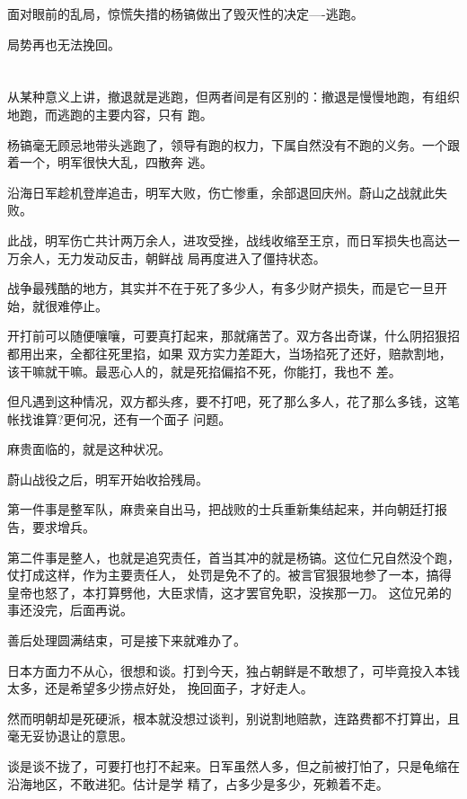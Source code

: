 \documentclass[11pt,a4paper,onecolumn]{article}
\begin{document}
面对眼前的乱局，惊慌失措的杨镐做出了毁灭性的决定----逃跑。

局势再也无法挽回。

\section[\thesection]{}

从某种意义上讲，撤退就是逃跑，但两者间是有区别的：撤退是慢慢地跑，有组织地跑，而逃跑的主要内容，只有
跑。

杨镐毫无顾忌地带头逃跑了，领导有跑的权力，下属自然没有不跑的义务。一个跟着一个，明军很快大乱，四散奔
逃。

沿海日军趁机登岸追击，明军大败，伤亡惨重，余部退回庆州。蔚山之战就此失败。

此战，明军伤亡共计两万余人，进攻受挫，战线收缩至王京，而日军损失也高达一万余人，无力发动反击，朝鲜战
局再度进入了僵持状态。

战争最残酷的地方，其实并不在于死了多少人，有多少财产损失，而是它一旦开始，就很难停止。

开打前可以随便嚷嚷，可要真打起来，那就痛苦了。双方各出奇谋，什么阴招狠招都用出来，全都往死里掐，如果
双方实力差距大，当场掐死了还好，赔款割地，该干嘛就干嘛。最恶心人的，就是死掐偏掐不死，你能打，我也不
差。

但凡遇到这种情况，双方都头疼，要不打吧，死了那么多人，花了那么多钱，这笔帐找谁算?更何况，还有一个面子
问题。

麻贵面临的，就是这种状况。

蔚山战役之后，明军开始收拾残局。

第一件事是整军队，麻贵亲自出马，把战败的士兵重新集结起来，并向朝廷打报告，要求增兵。

第二件事是整人，也就是追究责任，首当其冲的就是杨镐。这位仁兄自然没个跑，仗打成这样，作为主要责任人，
处罚是免不了的。被言官狠狠地参了一本，搞得皇帝也怒了，本打算劈他，大臣求情，这才罢官免职，没挨那一刀。
这位兄弟的事还没完，后面再说。

善后处理圆满结束，可是接下来就难办了。

日本方面力不从心，很想和谈。打到今天，独占朝鲜是不敢想了，可毕竟投入本钱太多，还是希望多少捞点好处，
挽回面子，才好走人。

然而明朝却是死硬派，根本就没想过谈判，别说割地赔款，连路费都不打算出，且毫无妥协退让的意思。

谈是谈不拢了，可要打也打不起来。日军虽然人多，但之前被打怕了，只是龟缩在沿海地区，不敢进犯。估计是学
精了，占多少是多少，死赖着不走。

\section[\thesection]{}
\end{document}
